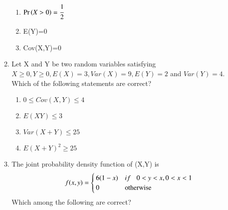 \begin{enumerate}[label=\thesection.\arabic*.,ref=\thesection.\theenumi]
\begin{enumerate}
    \item
    $\Pr\left(X>0\right)=\cfrac{1}{2}$
    
    \item
    E(Y)=0
    
    \item
    Cov(X,Y)=0
\end{enumerate}
%
%
\solution


\item Let X and Y be two random variables satisfying $X\geq 0, Y \geq 0, E(X)=3, Var(X)=9, E(Y)=2$ and $Var(Y)=4$. Which of the following statements are correct?
\begin{enumerate}[label=\Alph*)]
    \item $0\leq Cov(X,Y)\leq 4$
    \item $E(XY)\leq 3$
    \item $Var(X+Y)\leq 25$
    \item $E(X+Y)^2\geq 25$
\end{enumerate}
%
\solution

%
\item The joint probability density function of (X,Y) is
\begin{equation}
    f(x,y) =
    \begin{cases}
        6(1-x) & if \hspace{0.3cm}0<y<x ,0<x<1\label{0.0.1} \\
        0      & \text{otherwise}
    \end{cases}
\end{equation}
Which among the following are correct?
\end{enumerate}
